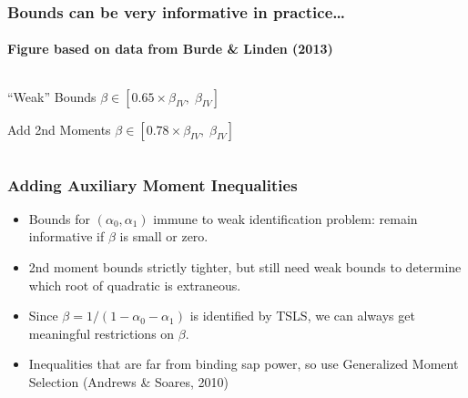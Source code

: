 \documentclass{beamer}
\begin{document}
\begin{frame}[c]
  \frametitle{Bounds can be very informative in practice\ldots}
  \framesubtitle{Figure based on data from Burde \& Linden (2013)}
\begin{columns}[c]
  \begin{column}{0.4\textwidth}
    \begin{block}{``Weak'' Bounds}
      $\beta \in [0.65 \times\beta_{IV},\; \beta_{IV}]$
    \end{block}
    \vspace{1em}
    \begin{alertblock}{Add 2nd Moments}
      $\beta \in [0.78 \times \beta_{IV},\;\beta_{IV}]$
    \end{alertblock}
  \end{column}
  \begin{column}{0.6\textwidth}
      \begin{figure}[h]
        \centering
      \end{figure}
  \end{column}
\end{columns}
 
\end{frame}
\begin{frame}
  \frametitle{Adding Auxiliary Moment Inequalities}

  \begin{itemize}
    \item Bounds for $(\alpha_0, \alpha_1)$ immune to weak identification problem: remain informative if $\beta$ is small or zero.
    \item 2nd moment bounds strictly tighter, but still need weak bounds to determine which root of  quadratic is extraneous.
    \item Since $\beta = 1/(1 - \alpha_0 - \alpha_1)$ is identified by TSLS, we can always get meaningful restrictions on $\beta$.
    \item Inequalities that are far from binding sap power, so use Generalized Moment Selection (Andrews \& Soares, 2010) 
  \end{itemize}

  
\end{frame}
\end{document}
